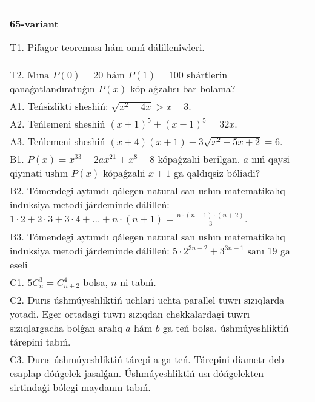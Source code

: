 \documentclass{article}
\begin{document}
\begin{tabular}{m{17cm}}
\textbf{65-variant}
\newline

T1. Pifagor teoreması hám onıń dálilleniwleri. \\
T2. Mına \(P(0) = 20\) hám \(P(1) = 100\) shártlerin qanaǵatlandıratuǵın \(P(x)\) kóp aǵzalısı bar bolama? \\
A1. Teńsizlikti sheshiń: \(\sqrt{x^{2} - 4x} > x - 3\). \\
A2. Teńlemeni sheshiń \((x + 1)^{5} + (x - 1)^{5} = 32x\). \\
A3. Teńlemeni sheshiń \((x + 4)(x + 1) - 3\sqrt{x^{2} + 5x + 2} = 6\). \\
B1. \(P(x) = x^{33} - 2ax^{21} + x^{8} + 8\) kópaǵzalıi berilgan. \(a\) nıń qaysi qiymati ushın \(P(x)\) kópaǵzalıi \(x + 1\) ga qaldıqsiz bóliadi? \\
B2. Tómendegi aytımdı qálegen natural san ushın matematikalıq induksiya metodi járdeminde dálilleń: \(1 \cdot 2 + 2 \cdot 3 + 3 \cdot 4 + \ldots + n \cdot (n + 1) = \frac{n \cdot (n + 1) \cdot (n + 2)}{3}\). \\
B3. Tómendegi aytımdı qálegen natural san ushın matematikalıq induksiya metodi járdeminde dálilleń: \(5 \cdot 2^{3n - 2} + 3^{3n - 1}\) sanı 19 ga eseli \\
C1. \(5C_{n}^{3} = C_{n + 2}^{4}\) bolsa, \(n\) ni tabıń. \\
C2. Durıs úshmúyeshliktiń uchlari uchta parallel tuwrı sızıqlarda yotadi. Eger ortadagi tuwrı sızıqdan chekkalardagi tuwrı sızıqlargacha bolǵan aralıq \(a\) hám \(b\) ga teń bolsa, úshmúyeshliktiń tárepini tabıń. \\
C3. Durıs úshmúyeshliktiń tárepi a ga teń. Tárepini diametr deb esaplap dóńgelek jasalǵan. Úshmúyeshliktiń usı dóńgelekten sirtindaǵi bólegi maydanın tabıń. \\

\end{tabular}
\vspace{1cm}
\end{document}
